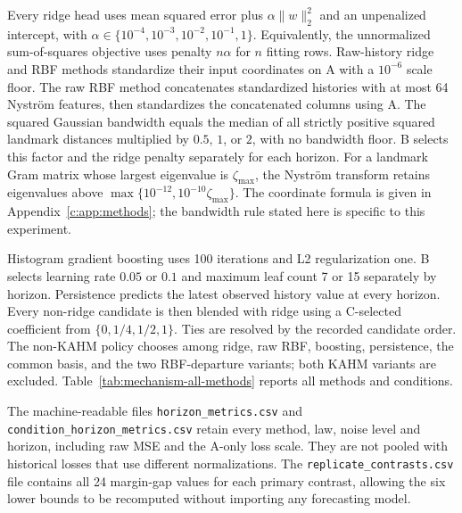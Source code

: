 Every ridge head uses mean squared error plus
$\alpha\|w\|_2^2$ and an unpenalized intercept, with
$\alpha\in\{10^{-4},10^{-3},10^{-2},10^{-1},1\}$. Equivalently,
the unnormalized sum-of-squares objective uses penalty $n\alpha$ for
$n$ fitting rows. Raw-history ridge and RBF methods standardize their
input coordinates on A with a $10^{-6}$ scale floor. The raw RBF method
concatenates standardized histories with at most 64 Nystr\"om features,
then standardizes the concatenated columns using A. The squared Gaussian
bandwidth equals the median of all strictly positive squared landmark
distances multiplied by $0.5$, $1$, or $2$, with no bandwidth floor. B
selects this factor and the ridge penalty separately for each horizon.
For a landmark Gram matrix whose largest eigenvalue is $\zeta_{\max}$,
the Nystr\"om transform retains eigenvalues above
$\max\{10^{-12},10^{-10}\zeta_{\max}\}$. The coordinate formula is
given in Appendix~\ref{c:app:methods}; the bandwidth rule stated here
is specific to this experiment.

Histogram gradient boosting uses 100 iterations and L2 regularization
one. B selects learning rate $0.05$ or $0.1$ and maximum leaf count
7 or 15 separately by horizon. Persistence predicts the latest observed
history value at every horizon. Every non-ridge candidate is then blended
with ridge using a C-selected coefficient from $\{0,1/4,1/2,1\}$.
Ties are resolved by the recorded candidate order. The non-KAHM policy
chooses among ridge, raw RBF, boosting, persistence, the common basis,
and the two RBF-departure variants; both KAHM variants are excluded.
Table~\ref{tab:mechanism-all-methods} reports all methods and conditions.

\begin{table}[!htbp]
\centering\scriptsize
\setlength{\tabcolsep}{3pt}
\caption{All ten procedures, every declared law and both added-noise levels.
Entries are mean horizon-averaged A-variance-normalized D MSE over 24
repetitions; lower is better. The first six columns enter the nonlinear
aggregate with equal weight. The final two form the separate linear control.
These conditionwise summaries are descriptive. ``Unbounded'' omits only the
departure radial bound. Persistence and raw nonlinear controls include their
C-selected blend with ridge.}
\label{tab:mechanism-all-methods}

\end{table}

The machine-readable files \texttt{horizon\_metrics.csv} and
\texttt{condition\_horizon\_metrics.csv} retain every method, law, noise
level and horizon, including raw MSE and the A-only loss scale. They are not
pooled with historical losses that use different normalizations. The
\texttt{replicate\_contrasts.csv} file contains all 24 margin-gap values for
each primary contrast, allowing the six lower bounds to be recomputed without
importing any forecasting model.

